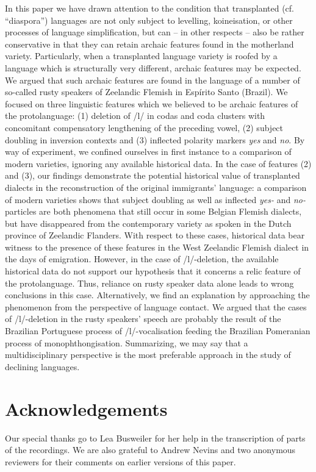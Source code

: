 \documentclass[output=paper,hidelinks,draftmode]{langscibook}
\begin{document}
In this paper we have drawn attention to the condition that transplanted (cf. ``diaspora'') languages are not only subject to levelling, koineisation, or other processes of language simplification, but can – in other respects – also be rather conservative in that they can retain archaic features found in the motherland variety. Particularly, when a transplanted language variety is roofed by a language which is structurally very different, archaic features may be expected. We argued that such archaic features are found in the language of a number of so-called rusty speakers of Zeelandic Flemish in Espírito Santo (Brazil). We focused on three linguistic features which we believed to be archaic features of the protolanguage: (1) deletion of /l/ in codas and coda clusters with concomitant compensatory lengthening of the preceding vowel, (2) subject doubling in inversion contexts and (3) inflected polarity markers \textit{yes} and \textit{no}. By way of experiment, we confined ourselves in first instance to a comparison of modern varieties, ignoring any available historical data. In the case of features (2) and (3), our findings demonstrate the potential historical value of transplanted dialects in the reconstruction of the original immigrants’ language: a comparison of modern varieties shows that subject doubling as well as inflected \textit{yes-} and \textit{no-}particles are both phenomena that still occur in some Belgian Flemish dialects, but have disappeared from the contemporary variety as spoken in the Dutch province of Zeelandic Flanders. With respect to these cases, historical data bear witness to the presence of these features in the West Zeelandic Flemish dialect in the days of emigration. However, in the case of /l/-deletion, the available historical data do not support our hypothesis that it concerns a relic feature of the protolanguage. Thus, reliance on rusty speaker data alone leads to wrong conclusions in this case. Alternatively, we find an explanation by approaching the phenomenon from the perspective of language contact. We argued that the cases of /l/-deletion in the rusty speakers’ speech are probably the result of the Brazilian Portuguese process of /l/-vocalisation feeding the Brazilian Pomeranian process of monophthongisation. Summarizing, we may say that a multidisciplinary perspective is the most preferable approach in the study of declining languages.

\section*{Acknowledgements}
 Our special thanks go to Lea Busweiler for her help in the transcription of parts of the recordings. We are also grateful to Andrew Nevins and two anonymous reviewers for their comments on earlier versions of this paper.

\sloppy\printbibliography[heading=subbibliography,notkeyword=this]
\end{document}
